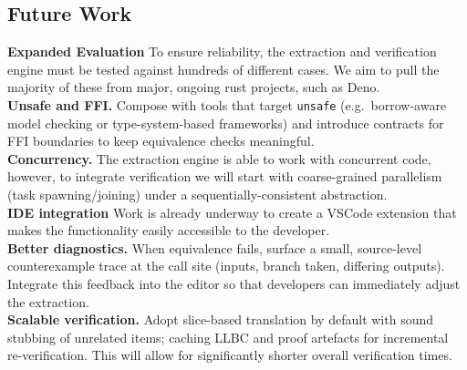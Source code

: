 \documentclass[format=sigplan,screen,10pt]{acmart}
\begin{document}
\subsection*{Future Work} 
\textbf{Expanded Evaluation} To ensure reliability, the extraction and verification engine must be tested against hundreds of different cases. We aim to pull the majority of these from major, ongoing rust projects, such as Deno. \\     
\textbf{Unsafe and FFI.}
Compose with tools that target \texttt{unsafe} (e.g.\ borrow-aware model checking or type-system-based frameworks) and introduce contracts for FFI boundaries to keep equivalence checks meaningful. \\
\textbf{Concurrency.}
The extraction engine is able to work with concurrent code, however, to integrate verification we will start with coarse-grained parallelism (task spawning/joining) under a sequentially-consistent abstraction. \\
\textbf{IDE integration} 
Work is already underway to create a VSCode extension that makes the functionality easily accessible to the developer.  \\
\textbf{Better diagnostics.}
When equivalence fails, surface a small, source-level counterexample trace at the call site (inputs, branch taken, differing outputs). Integrate this feedback into the editor so that developers can immediately adjust the extraction. \\
\textbf{Scalable verification.}
Adopt slice-based translation by default with sound stubbing of unrelated items; caching LLBC and proof artefacts for incremental re-verification. This will allow for significantly shorter overall verification times.
\vspace{-0.5\baselineskip}



\appendix
\end{document}
